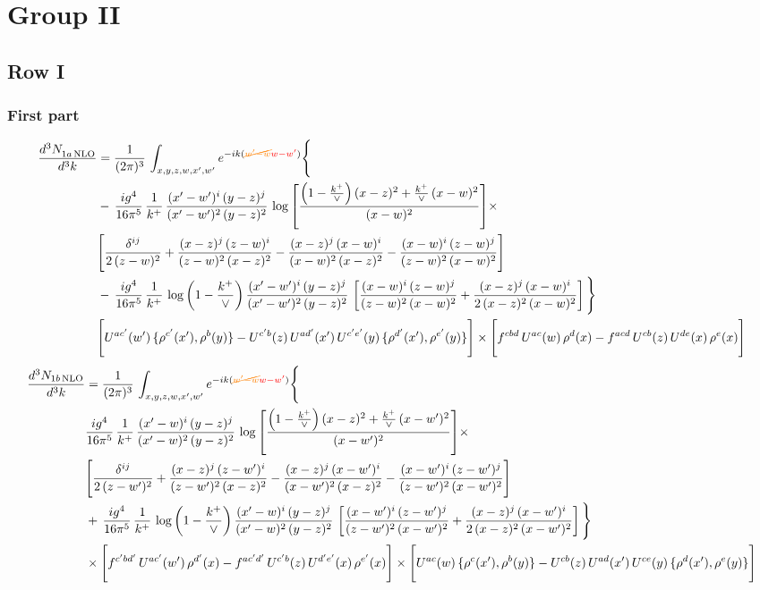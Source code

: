 \documentclass[9pt]{article}
\numberwithin{equation}{section}
\begin{document}
\section{Group II}
\subsection{Row I}
\subsubsection{First part}
\begin{align}
 \frac{d^{3}N_{1a\,\rm NLO}^{\rm}}{d^{3}k}  & =     \frac{1}{(2\pi)^{3}}\,\int_{x,y,z,w,x',w^{\prime}} e^{-ik({\color{orange}\cancel{w^{\prime}-w}}{\color{red}w-w^{\prime}})}\Bigg\{\notag \\
& -\, \frac{ig^{4}}{16\pi^{5}}\,\frac{1}{k^{+}}\, \frac{(x'-w')^{i}\,(y-z)^{j}}{(x'-w')^{2}\,(y-z)^{2}}\,\log{\left[\frac{\left(1-\frac{k^{+}}{\vee}\right)(x-z)^{2}+\frac{k^{+}}{\vee}\,(x-w)^{2}}{(x-w)^{2}}\right]}\times\notag \\ &  \Bigg[\frac{\delta^{ij}}{2\,(z-w)^{2}}+\frac{(x-z)^{j}\,(z-w)^{i}}{(z-w)^{2}\,(x-z)^{2}}-\frac{(x-z)^{j}\,(x-w)^{i}}{(x-w)^{2}\,(x-z)^{2}}-\frac{(x-w)^{i}\,(z-w)^{j}}{(z-w)^{2}\,(x-w)^{2}}\Bigg] \notag \\
& -\, \frac{ig^{4}}{16\pi^{5}}\,\frac{1}{k^{+}}\,\log{\left(1-\frac{k^{+}}{\vee}\right)}\,\frac{(x'-w')^{i}\,(y-z)^{j}}{(x'-w')^{2}\,(y-z)^{2}}\,\left[\frac{(x-w)^{i}\,(z-w)^{j}}{(z-w)^{2}\,(x-w)^{2}}+\frac{(x-z)^{j}\,(x-w)^{i}}{2\,(x-z)^{2}\, (x-w)^{2}}\right]\Bigg\} \notag \\ & \Bigg[U^{ac'}(w')\,\{\rho^{c'}(x'),\rho^{b}(y)\}-U^{c'b}(z)\,U^{ad'}(x')\,U^{c'e'}(y)\, \{\rho^{d'}(x'),\rho^{e'}(y)\}\Bigg]\times \Bigg[f^{cbd}\,U^{ac}(w)\,\rho^{d}(x)-f^{acd}\, U^{cb}(z)\,U^{de}(x)\,\rho^{e}(x)\Bigg]
\end{align}
\begin{align}
\frac{d^{3}N_{1b\, \rm NLO}}{d^{3}k} & =  \frac{1}{(2\pi)^{3}}\,\int_{x,y,z,w,x',w^{\prime}} e^{-ik({\color{orange}\cancel{w^{\prime}-w}}{\color{red}w-w^{\prime}})}\Bigg\{\notag \\
&  \frac{ig^{4}}{16\pi^{5}}\,\frac{1}{k^{+}}\, \frac{(x'-w)^{i}\,(y-z)^{j}}{(x'-w)^{2}\,(y-z)^{2}}\,\log{\left[\frac{\left(1-\frac{k^{+}}{\vee}\right)(x-z)^{2}+\frac{k^{+}}{\vee}\,(x-w')^{2}}{(x-w')^{2}}\right]}\times\notag \\ &  \Bigg[\frac{\delta^{ij}}{2\,(z-w')^{2}}+\frac{(x-z)^{j}\,(z-w')^{i}}{(z-w')^{2}\,(x-z)^{2}}-\frac{(x-z)^{j}\,(x-w')^{i}}{(x-w')^{2}\,(x-z)^{2}}-\frac{(x-w')^{i}\,(z-w')^{j}}{(z-w')^{2}\,(x-w')^{2}}\Bigg] \notag \\
& +\,\frac{ig^{4}}{16\pi^{5}}\,\frac{1}{k^{+}}\,\log{\left(1-\frac{k^{+}}{\vee}\right)}\,\frac{(x'-w)^{i}\,(y-z)^{j}}{(x'-w)^{2}\,(y-z)^{2}}\,\left[\frac{(x-w')^{i}\,(z-w')^{j}}{(z-w')^{2}\,(x-w')^{2}}+\frac{(x-z)^{j}\,(x-w')^{i}}{2\,(x-z)^{2}\, (x-w')^{2}}\right]\Bigg\} \notag \\ & \times\Bigg[f^{c'bd'}\,U^{ac'}(w')\,\rho^{d'}(x)-f^{ac'd'}\, U^{c'b}(z)\,U^{d'e'}(x)\,\rho^{e'}(x)\Bigg] \times \Bigg[U^{ac}(w)\,\{\rho^{c}(x'),\rho^{b}(y)\}-U^{cb}(z)\,U^{ad}(x')\,U^{ce}(y)\, \{\rho^{d}(x'),\rho^{e}(y)\}\Bigg]
\end{align}
\end{document}
